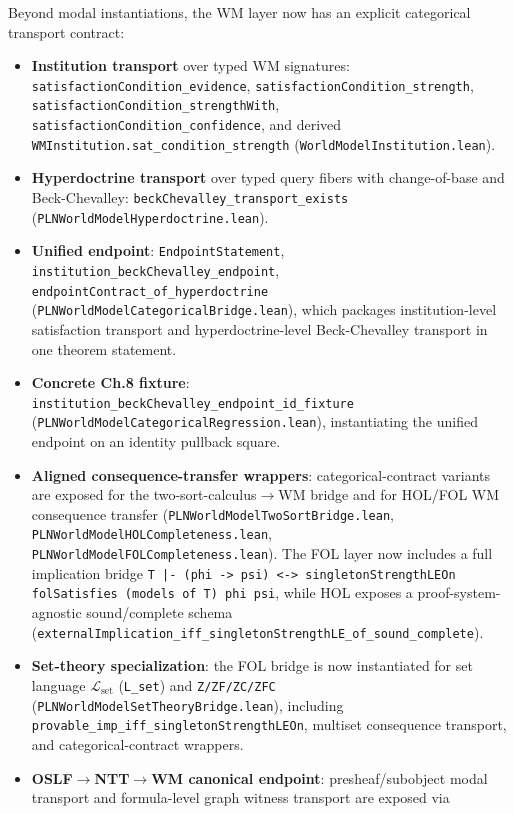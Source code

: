 \documentclass[]{article}
\newcommand{\code}[1]{\texttt{#1}}
\begin{document}
Beyond modal instantiations, the WM layer now has an explicit categorical
transport contract:
\begin{itemize}[leftmargin=2em]
\item \textbf{Institution transport} over typed WM signatures:
  \code{satisfactionCondition\_evidence},
  \code{satisfactionCondition\_strength},
  \code{satisfactionCondition\_strengthWith},
  \code{satisfactionCondition\_confidence},
  and derived \code{WMInstitution.sat\_condition\_strength}
  (\code{WorldModelInstitution.lean}).
\item \textbf{Hyperdoctrine transport} over typed query fibers with
  change-of-base and Beck-Chevalley:
  \code{beckChevalley\_transport\_exists}
  (\code{PLNWorldModelHyperdoctrine.lean}).
\item \textbf{Unified endpoint}:
  \code{EndpointStatement},
  \code{institution\_beckChevalley\_endpoint},
  \code{endpointContract\_of\_hyperdoctrine}
  (\code{PLNWorldModelCategoricalBridge.lean}),
  which packages institution-level satisfaction transport and
  hyperdoctrine-level Beck-Chevalley transport in one theorem statement.
\item \textbf{Concrete Ch.8 fixture}:
  \code{institution\_beckChevalley\_endpoint\_id\_fixture}
  (\code{PLNWorldModelCategoricalRegression.lean}),
  instantiating the unified endpoint on an identity pullback square.
\item \textbf{Aligned consequence-transfer wrappers}:
  categorical-contract variants are exposed for the two-sort-calculus$\rightarrow$WM
  bridge and for HOL/FOL WM consequence transfer
  (\code{PLNWorldModelTwoSortBridge.lean},
   \code{PLNWorldModelHOLCompleteness.lean},
   \code{PLNWorldModelFOLCompleteness.lean}).
  The FOL layer now includes a full implication bridge
  \code{T |- (phi -> psi) <-> singletonStrengthLEOn folSatisfies (models of T) phi psi},
  while HOL exposes a proof-system-agnostic sound/complete schema
  (\code{externalImplication\_iff\_singletonStrengthLE\_of\_sound\_complete}).
\item \textbf{Set-theory specialization}: the FOL bridge is now instantiated for
  set language $\mathcal L_{\mathrm{set}}$ (\code{L\_set}) and
  \code{Z/ZF/ZC/ZFC}
  (\code{PLNWorldModelSetTheoryBridge.lean}), including
  \code{provable\_imp\_iff\_singletonStrengthLEOn},
  multiset consequence transport, and categorical-contract wrappers.
\item \textbf{OSLF$\rightarrow$NTT$\rightarrow$WM canonical endpoint}: presheaf/subobject
  modal transport and formula-level graph witness transport are exposed via

\end{itemize}
\end{document}
